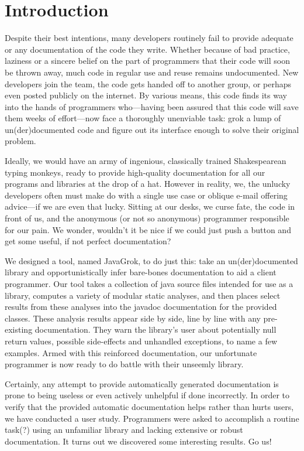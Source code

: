 \section{Introduction}

Despite their best intentions, many developers routinely fail to provide adequate or any documentation of the code they write.  Whether because of bad practice, laziness or a sincere belief on the part of programmers that their code will soon be thrown away, much code in regular use and reuse remains undocumented.  New developers join the team, the code gets handed off to another group, or perhaps even posted publicly on the internet.  By various means, this code finds its way into the hands of programmers who---having been assured that this code will save them weeks of effort---now face a thoroughly unenviable task: grok a lump of un(der)documented code and figure out its interface enough to solve their original problem.

Ideally, we would have an army of ingenious, classically trained Shakespearean typing monkeys, ready to provide high-quality documentation for all our programs and libraries at the drop of a hat.  However in reality, we, the unlucky developers often must make do with a single use case or oblique e-mail offering advice---if we are even that lucky.  Sitting at our desks, we curse fate, the code in front of us, and the anonymous (or not so anonymous) programmer responsible for our pain.  We wonder, wouldn't it be nice if we could just push a button and get some useful, if not perfect documentation?

We designed a tool, named JavaGrok, to do just this: take an un(der)documented library and opportunistically infer bare-bones documentation to aid a client programmer.  Our tool takes a collection of java source files intended for use as a library, computes a variety of modular static analyses, and then places select results from these analyses into the javadoc documentation for the provided classes.  These analysis results appear side by side, line by line with any pre-existing documentation.  They warn the library's user about potentially null return values, possible side-effects and unhandled exceptions, to name a few examples.  Armed with this reinforced documentation, our unfortunate programmer is now ready to do battle with their unseemly library.

Certainly, any attempt to provide automatically generated documentation is prone to being useless or even actively unhelpful if done incorrectly.  In order to verify that the provided automatic documentation helps rather than hurts users, we have conducted a user study.  Programmers were asked to accomplish a routine task(?) using an unfamiliar library and lacking extensive or robust documentation.  It turns out we discovered some interesting results.  Go us!